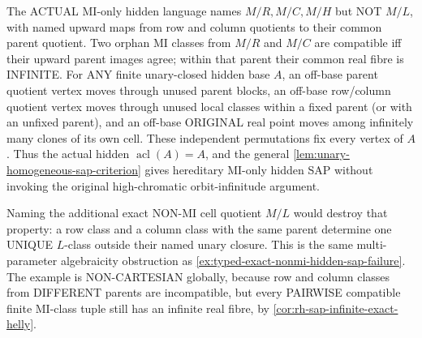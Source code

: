 \begin{example}
The ACTUAL MI-only hidden language
names $M/R,M/C,M/H$ but NOT $M/L$,
with named upward maps from row
and column quotients to their
common parent quotient.
Two orphan MI classes from
$M/R$ and $M/C$ are compatible
iff their upward parent images
agree; within that parent
their common real fibre is
INFINITE. For ANY finite
unary-closed hidden base $A$,
an off-base parent quotient
vertex moves through unused
parent blocks, an off-base
row/column quotient vertex
moves through unused local
classes within a fixed parent
(or with an unfixed parent),
and an off-base ORIGINAL real
point moves among infinitely
many clones of its own cell.
These independent permutations
fix every vertex of $A$.
Thus the actual hidden
$\operatorname{acl}(A)=A$,
and the general
\cref{lem:unary-homogeneous-sap-criterion}
gives hereditary MI-only
hidden SAP without invoking the
original high-chromatic
orbit-infinitude argument.

Naming the additional exact
NON-MI cell quotient $M/L$
would destroy that property:
a row class and a column class
with the same parent determine
one UNIQUE $L$-class outside
their named unary closure.
This is the same multi-parameter
algebraicity obstruction as
\cref{ex:typed-exact-nonmi-hidden-sap-failure}.
The example is NON-CARTESIAN
globally, because row and column
classes from DIFFERENT parents
are incompatible, but every
PAIRWISE compatible finite
MI-class tuple still has an
infinite real fibre, by
\cref{cor:rh-sap-infinite-exact-helly}.
\end{example}

